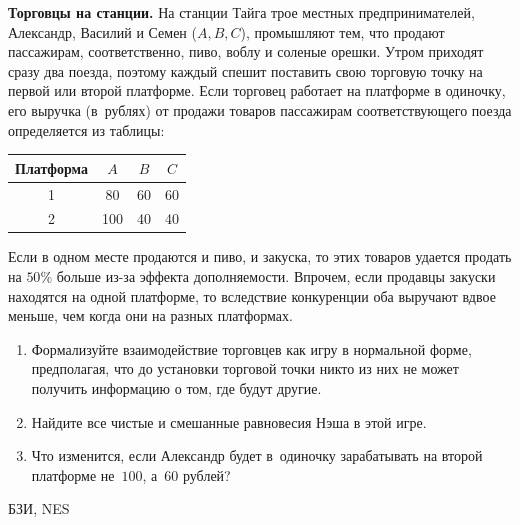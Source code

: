 \begin{problem}
 {\bf Торговцы на станции.} На станции Тайга трое
местных предпринимателей, Александр, Василий и Семен
($A,B,C$), промышляют тем, что продают пассажирам,
соответственно, пиво, воблу и соленые орешки. Утром
приходят сразу два поезда, поэтому каждый спешит поставить
свою торговую точку на первой или второй платформе. Если
торговец работает на платформе в одиночку, его выручка
(в~рублях) от продажи товаров пассажирам соответствующего
поезда определяется из таблицы:
\begin{center}
\begin{tabular}{|c|ccc|}
\hline Платформа&$A$&$B$&$C$\\ \hline 1&80&60&60\\ 2&100&40&40\\
\hline
\end{tabular}
\end{center}
Если в одном месте продаются и пиво, и закуска, то этих
товаров удается продать на $50\%$ больше из-за эффекта
дополняемости. Впрочем, если продавцы закуски находятся на
одной платформе, то вследствие конкуренции оба выручают
вдвое меньше, чем когда они на разных платформах.
\begin{enumerate}

\item Формализуйте взаимодействие торговцев как игру в
нормальной форме, предполагая, что до установки торговой
точки никто из них не может получить информацию о том, где
будут другие.

\item Найдите все чистые и смешанные равновесия Нэша в этой
игре.

\item Что изменится, если Александр будет в~одиночку
зарабатывать на второй платформе не~$100$, а~$60$ рублей?

\end{enumerate}




\begin{source}
БЗИ, NES
\end{source}


\begin{sol}

\end{sol}
\end{problem}




